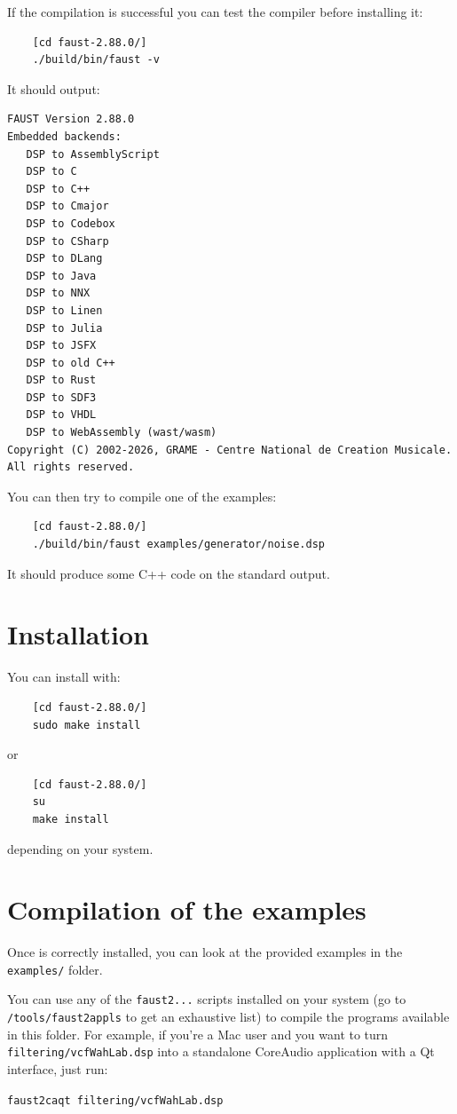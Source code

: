 If the compilation is successful you can test the compiler before installing it:
\begin{lstlisting}
	[cd faust-2.88.0/]
	./build/bin/faust -v
\end{lstlisting}
It should output:
\begin{lstlisting}
FAUST Version 2.88.0
Embedded backends: 
   DSP to AssemblyScript
   DSP to C
   DSP to C++
   DSP to Cmajor
   DSP to Codebox
   DSP to CSharp
   DSP to DLang
   DSP to Java
   DSP to NNX
   DSP to Linen
   DSP to Julia
   DSP to JSFX
   DSP to old C++
   DSP to Rust
   DSP to SDF3
   DSP to VHDL
   DSP to WebAssembly (wast/wasm)
Copyright (C) 2002-2026, GRAME - Centre National de Creation Musicale. All rights reserved. 
\end{lstlisting}

You can then try to compile one of the examples:
\begin{lstlisting}
	[cd faust-2.88.0/]
	./build/bin/faust examples/generator/noise.dsp
\end{lstlisting}
It should produce some C++ code on the standard output.

\section{Installation}
You can install \faust with:
\begin{lstlisting}
	[cd faust-2.88.0/]
	sudo make install
\end{lstlisting}
or
\begin{lstlisting}
	[cd faust-2.88.0/]
	su
	make install
\end{lstlisting}
depending on your system.

\section{Compilation of the examples}

Once \faust is correctly installed, you can look at the provided examples in the \lstinline'examples/' folder. 

You can use any of the \lstinline'faust2...' scripts installed on your system (go to \lstinline'/tools/faust2appls' to get an exhaustive list) to compile the \faust programs available in this folder. For example, if you're a Mac user and you want to turn \lstinline'filtering/vcfWahLab.dsp' into a standalone CoreAudio application with a Qt interface, just run:

\lstinline'faust2caqt filtering/vcfWahLab.dsp'
